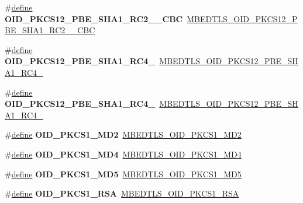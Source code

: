 \begin{DoxyCompactItemize}
\#\hyperlink{structdefine}{define} {\bfseries O\+I\+D\+\_\+\+P\+K\+C\+S12\+\_\+\+P\+B\+E\+\_\+\+S\+H\+A1\+\_\+\+R\+C2\+\_\+\_\+\+C\+BC}~\hyperlink{oid_8h_aa680c0462de66573a7f3a0f0de930c57}{M\+B\+E\+D\+T\+L\+S\+\_\+\+O\+I\+D\+\_\+\+P\+K\+C\+S12\+\_\+\+P\+B\+E\+\_\+\+S\+H\+A1\+\_\+\+R\+C2\+\_\+\_\+\+C\+BC}
\item 
\mbox{\label{compat-1_83_8h_abb06fa6854c5c9c2bba45669a3c86b7f}} 
\#\hyperlink{structdefine}{define} {\bfseries O\+I\+D\+\_\+\+P\+K\+C\+S12\+\_\+\+P\+B\+E\+\_\+\+S\+H\+A1\+\_\+\+R\+C4\+\_}~\hyperlink{oid_8h_a2350b20503431bc5f7a9c91d50a358e1}{M\+B\+E\+D\+T\+L\+S\+\_\+\+O\+I\+D\+\_\+\+P\+K\+C\+S12\+\_\+\+P\+B\+E\+\_\+\+S\+H\+A1\+\_\+\+R\+C4\+\_}
\item 
\mbox{\label{compat-1_83_8h_aa6306a80eb221ed58dc1a37585aad85d}} 
\#\hyperlink{structdefine}{define} {\bfseries O\+I\+D\+\_\+\+P\+K\+C\+S12\+\_\+\+P\+B\+E\+\_\+\+S\+H\+A1\+\_\+\+R\+C4\+\_}~\hyperlink{oid_8h_af920a658a053560ecd15da391d8a21c2}{M\+B\+E\+D\+T\+L\+S\+\_\+\+O\+I\+D\+\_\+\+P\+K\+C\+S12\+\_\+\+P\+B\+E\+\_\+\+S\+H\+A1\+\_\+\+R\+C4\+\_}
\item 
\mbox{\label{compat-1_83_8h_a89463340cd4abd80744a74d949ccf127}} 
\#\hyperlink{structdefine}{define} {\bfseries O\+I\+D\+\_\+\+P\+K\+C\+S1\+\_\+\+M\+D2}~\hyperlink{oid_8h_a7cded731af9f9b31560ddd5275150508}{M\+B\+E\+D\+T\+L\+S\+\_\+\+O\+I\+D\+\_\+\+P\+K\+C\+S1\+\_\+\+M\+D2}
\item 
\mbox{\label{compat-1_83_8h_a3bddb9824400870a99b024e473f49d81}} 
\#\hyperlink{structdefine}{define} {\bfseries O\+I\+D\+\_\+\+P\+K\+C\+S1\+\_\+\+M\+D4}~\hyperlink{oid_8h_a397d7f5d219f4853131f615bb8f22408}{M\+B\+E\+D\+T\+L\+S\+\_\+\+O\+I\+D\+\_\+\+P\+K\+C\+S1\+\_\+\+M\+D4}
\item 
\mbox{\label{compat-1_83_8h_a2e73c54fa978e56850f62b2d877a018f}} 
\#\hyperlink{structdefine}{define} {\bfseries O\+I\+D\+\_\+\+P\+K\+C\+S1\+\_\+\+M\+D5}~\hyperlink{oid_8h_a94c671bace8030d886c47a6d05f6502f}{M\+B\+E\+D\+T\+L\+S\+\_\+\+O\+I\+D\+\_\+\+P\+K\+C\+S1\+\_\+\+M\+D5}
\item 
\mbox{\label{compat-1_83_8h_a89f411612e522c42397ebfd1f9b83fef}} 
\#\hyperlink{structdefine}{define} {\bfseries O\+I\+D\+\_\+\+P\+K\+C\+S1\+\_\+\+R\+SA}~\hyperlink{oid_8h_a07dd2515d8e69934e974db139251d968}{M\+B\+E\+D\+T\+L\+S\+\_\+\+O\+I\+D\+\_\+\+P\+K\+C\+S1\+\_\+\+R\+SA}

\end{DoxyCompactItemize}
